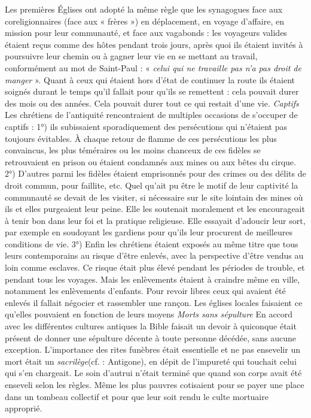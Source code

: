  Les premières Églises ont adopté la même règle que les synagogues face aux coreligionnaires (face aux « frères ») en déplacement, en voyage d'affaire, en mission pour leur communauté, et face aux vagabonds : les voyageurs valides étaient reçus comme des hôtes pendant trois jours, après quoi ils étaient invités à poursuivre leur chemin ou à gagner leur vie en se mettant au travail, conformément au mot de Saint-Paul : « \emph{celui qui ne travaille pas n'a pas droit de manger} ». 
 Quant à ceux qui étaient hors d'état de continuer la route ils étaient soignés durant le temps qu'il fallait pour qu'ils se remettent : cela pouvait durer des mois ou des années. Cela pouvait durer tout ce qui restait d'une vie.
\emph{Captifs
}Les chrétiens de l'antiquité rencontraient de multiples occasions de s'occuper de captifs : 1°) ils subissaient sporadiquement des persécutions qui n'étaient pas toujours évitables. À chaque retour de flamme de ces persécutions les plus convaincus, les plus téméraires ou les moins chanceux de ces fidèles se retrouvaient en prison ou étaient condamnés aux mines ou aux bêtes du cirque. 2°) D'autres parmi les fidèles étaient emprisonnés pour des crimes ou des délits de droit commun, pour faillite, etc. Quel qu'ait pu être le motif de leur captivité la communauté se devait de les visiter, si nécessaire sur le site lointain des mines où ils et elles purgeaient leur peine. Elle les soutenait moralement et les encourageait à tenir bon dans leur foi et la pratique religieuse. Elle essayait d'adoucir leur sort, par exemple en soudoyant les gardiens pour qu'ils leur procurent de meilleures conditions de vie. 3°) Enfin les chrétiens étaient exposés au même titre que tous leurs contemporains au risque d'être enlevés, avec la perspective d'être vendus au loin comme esclaves. Ce risque était plus élevé pendant les périodes de trouble, et pendant tous les voyages. Mais les enlèvements étaient à craindre même en ville, notamment les enlèvements d'enfants. Pour revoir libres ceux qui avaient été enlevés il fallait négocier et rassembler une rançon. Les églises locales faisaient ce qu'elles pouvaient en fonction de leurs moyens 
\emph{Morts sans sépulture
}En accord avec les différentes cultures antiques la Bible faisait un devoir à quiconque était présent de donner une sépulture décente à toute personne décédée, sans aucune exception. L'importance des rites funèbres était essentielle et ne pas ensevelir un mort était un \emph{sacrilège}(cf. : Antigone), en dépit de l'impureté qui touchait celui qui s'en chargeait. Le soin d'autrui n'était terminé que quand son corps avait été enseveli selon les règles. Même les plus pauvres cotisaient pour se payer une place dans un tombeau collectif et pour que leur soit rendu le culte mortuaire approprié. 
